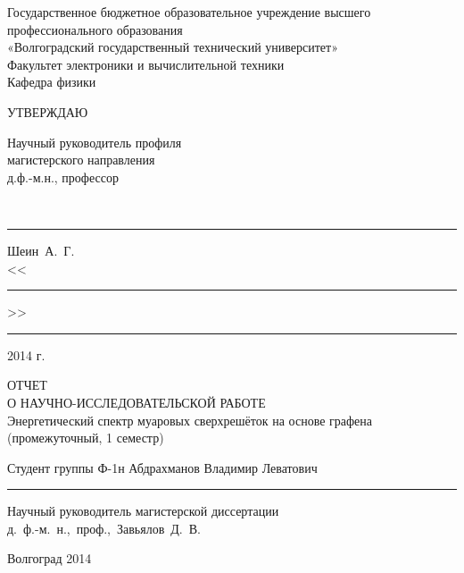 \begin{titlepage}
    \begin{center}
        Государственное бюджетное образовательное учреждение высшего
        профессионального образования\\
        «Волгоградский государственный технический университет»\\
        \vspace{1em}
        Факультет электроники  и  вычислительной  техники\\
        \vspace{0.6em}
        Кафедра физики\\ 
    \end{center}
    \begin{flushright}
        УТВЕРЖДАЮ\\
        \vspace{0.6em}
        \parbox{7cm}{
        Научный руководитель профиля \\
        магистерского направления\\
        д.ф.-м.н., профессор}\\
        \vspace{1em}
        \rule[-0.05cm]{4.5cm}{.1pt} Шеин~А.~Г.\\
        <<\rule[-0.05cm]{1cm}{.1pt}>>\rule[-0.05cm]{4cm}{.1pt} 2014 г.
    \end{flushright}
    \vfill
    \begin{center}
        ОТЧЕТ\\
        О  НАУЧНО-ИССЛЕДОВАТЕЛЬСКОЙ РАБОТЕ\\
        \vspace{1em}
        Энергетический спектр муаровых сверхрешёток на основе графена
        (промежуточный, 1 семестр)
    \end{center}
    Студент группы Ф-1н Абдрахманов Владимир Леватович \hfill \rule[-0.05cm]{3.5cm}{.1pt}
    \vspace{1em}
    \begin{flushright}
    Научный руководитель магистерской диссертации \hfill ~\\
        д.~ф.-м.~н.,~проф.,~Завьялов~Д.~В.
    \end{flushright}
    \vfill
    \begin{center}
        Волгоград 2014
    \end{center}
\end{titlepage}
\setcounter{page}{2}